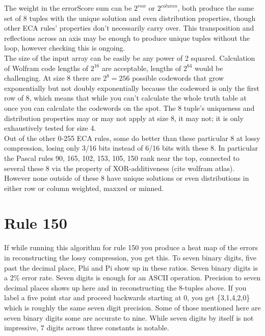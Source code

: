 \documentclass[11pt]{article}
\begin{document}
The weight in the errorScore sum can be $2^{row}$ or $2^{column}$, both produce the same set of 8 tuples with the unique solution and even distribution properties, though other ECA rules' properties don't necessarily carry over. This transposition and reflections across an axis may be enough to produce unique tuples without the loop, however checking this is ongoing.\\

The size of the input array can be easily be any power of 2 squared. Calculation of Wolfram code lengths of $2^{16}$ are acceptable, lengths of $2^{64}$ would be challenging. At size 8 there are $2^8=256$ possible codewords that grow exponentially but not doubly exponentially because the codeword is only the first row of 8, which means that while you can't calculate the whole truth table at once you can calculate the codewords on the spot. The 8 tuple's uniqueness and distribution properties may or may not apply at size 8, it may not; it is only exhaustively tested for size 4.\\

Out of the other 0-255 ECA rules, some do better than these particular 8 at lossy compression, losing only 3/16 bits instead of 6/16 bits with these 8. In particular the Pascal rules 90, 165, 102, 153, 105, 150 rank near the top, connected to several these 8 via the property of XOR-additiveness (cite wolfram atlas). However none outside of these 8 have unique solutions or even distributions in either row or column weighted, maxxed or minned.\\

\section{Rule 150}

If while running this algorithm for rule 150 you produce a heat map of the errors in reconstructing the lossy compression, you get this. To seven binary digits, five past the decimal place, Phi and Pi show up in these ratios. Seven binary digits is a 2\% error rate. Seven digits is enough for an ASCII operation. Precision to seven decimal places shows up here and in reconstructing the 8-tuples above. If you label a five point star and proceed backwards starting at 0, you get \{3,1,4,2,0\} which is roughly the same seven digit precision. Some of those mentioned here are seven binary digits some are accurate to nine. While seven digits by itself is not impressive, 7 digits across three constants is notable.\\
\end{document}
